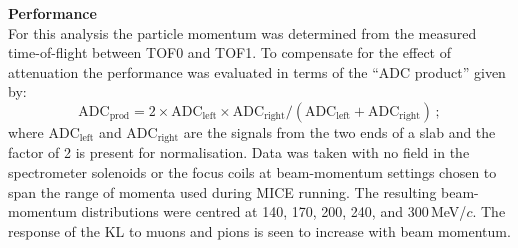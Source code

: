 \noindent\textbf{Performance} \\
\noindent
For this analysis the particle momentum was determined from the
measured time-of-flight between TOF0 and TOF1.
To compensate for the effect of attenuation the performance was
evaluated in terms of the ``ADC product'' given by:
\begin{equation}
  \text{ADC}_{\text{prod}} = 2 \times
    \text{ADC}_{\text{left}} \times \text{ADC}_{\text{right}} /
    (\text{ADC}_{\text{left}} + \text{ADC}_{\text{right}})\,;
\end{equation}
where ADC$_{\text{left}}$ and ADC$_{\text{right}}$ are the signals
from the two ends of a slab and the factor of 2 is present for
normalisation.
Data was taken with no field in the spectrometer solenoids or the
focus coils at beam-momentum settings chosen to span the range of
momenta used during MICE running.
The resulting beam-momentum distributions were centred at 140, 170,
200, 240, and 300\,MeV/$c$.
The response of the KL to muons and pions is seen to increase with
beam momentum.
  

